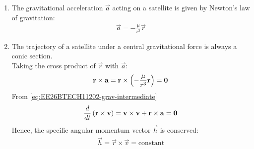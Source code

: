 \begin{enumerate}[label=\thesubsection.\arabic*, ref=\thesubsection.\theenumi]
\begin{align}
\end{align}
where
\begin{align}
	r=\norm{\vec{r}}, v=\norm{\vec{v}}
\end{align}
\item The gravitational acceleration $\vec{a}$ acting on a satellite is given by Newton's law of gravitation:
\begin{align}
\vec{a} = -\frac{\mu}{r^3}\vec{r}
\label{eq:EE26BTECH11202-grav_acc}
\end{align}
\item The trajectory of a satellite under a central gravitational force is always a conic section. \\
\solution
Taking the cross product of $\vec{r}$ with $\vec{a}$:
\begin{align}
	\mathbf{r} \times \mathbf{a} = \mathbf{r} \times \left(-\frac{\mu}{r^3}\mathbf{r}\right) = \mathbf{0} \label{eq:EE26BTECH11202-grav-intermediate}
\end{align}
From \eqref{eq:EE26BTECH11202-grav-intermediate}
\begin{align}\frac{d}{dt}\left(\mathbf{r} \times \mathbf{v}\right) = \mathbf{v} \times \mathbf{v} + \mathbf{r} \times \mathbf{a} = \mathbf{0}
\end{align}
Hence, the specific angular momentum vector $\vec{h}$ is conserved:
\begin{align}
\vec{h} = \vec{r} \times \vec{v} = \text{constant}
\label{eq:EE26BTECH11202-ang_mom}
\end{align}


\end{enumerate}
